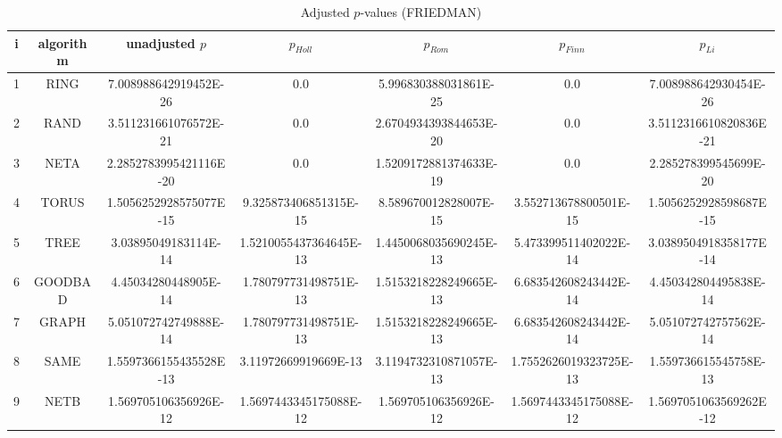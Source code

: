 \documentclass[a4paper,10pt]{article}
\begin{document}
\begin{landscape}
\begin{table}[!htp]
\centering\scriptsize
\caption{Adjusted $p$-values (FRIEDMAN)}
\begin{tabular}{ccccccc}
i&algorithm&unadjusted $p$&$p_{Holl}$&$p_{Rom}$&$p_{Finn}$&$p_{Li}$\\
\hline
1& RING&7.008988642919452E-26&0.0&5.996830388031861E-25&0.0&7.008988642930454E-26\\
2& RAND&3.511231661076572E-21&0.0&2.6704934393844653E-20&0.0&3.5112316610820836E-21\\
3& NETA&2.2852783995421116E-20&0.0&1.5209172881374633E-19&0.0&2.285278399545699E-20\\
4& TORUS&1.5056252928575077E-15&9.325873406851315E-15&8.589670012828007E-15&3.552713678800501E-15&1.5056252928598687E-15\\
5& TREE&3.03895049183114E-14&1.5210055437364645E-13&1.4450068035690245E-13&5.473399511402022E-14&3.0389504918358177E-14\\
6& GOODBAD&4.45034280448905E-14&1.780797731498751E-13&1.5153218228249665E-13&6.683542608243442E-14&4.450342804495838E-14\\
7& GRAPH&5.051072742749888E-14&1.780797731498751E-13&1.5153218228249665E-13&6.683542608243442E-14&5.051072742757562E-14\\
8& SAME&1.5597366155435528E-13&3.11972669919669E-13&3.1194732310871057E-13&1.7552626019323725E-13&1.559736615545758E-13\\
9& NETB&1.569705106356926E-12&1.5697443345175088E-12&1.569705106356926E-12&1.5697443345175088E-12&1.5697051063569262E-12\\
\hline
\end{tabular}
\end{table}


\newpage


\end{landscape}
\end{document}
